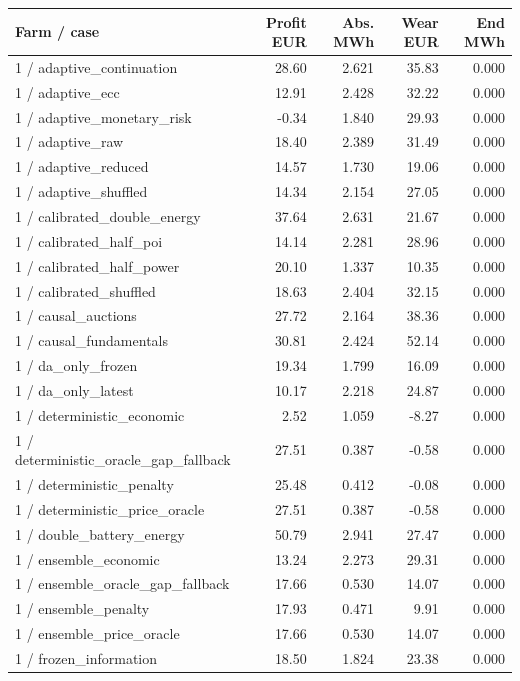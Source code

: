\begingroup\small
\begin{longtable}{lrrrr}
\toprule
Farm / case & Profit EUR & Abs. MWh & Wear EUR & End MWh\\
\midrule\endhead
1 / adaptive\_continuation & 28.60 & 2.621 & 35.83 & 0.000\\
1 / adaptive\_ecc & 12.91 & 2.428 & 32.22 & 0.000\\
1 / adaptive\_monetary\_risk & -0.34 & 1.840 & 29.93 & 0.000\\
1 / adaptive\_raw & 18.40 & 2.389 & 31.49 & 0.000\\
1 / adaptive\_reduced & 14.57 & 1.730 & 19.06 & 0.000\\
1 / adaptive\_shuffled & 14.34 & 2.154 & 27.05 & 0.000\\
1 / calibrated\_double\_energy & 37.64 & 2.631 & 21.67 & 0.000\\
1 / calibrated\_half\_poi & 14.14 & 2.281 & 28.96 & 0.000\\
1 / calibrated\_half\_power & 20.10 & 1.337 & 10.35 & 0.000\\
1 / calibrated\_shuffled & 18.63 & 2.404 & 32.15 & 0.000\\
1 / causal\_auctions & 27.72 & 2.164 & 38.36 & 0.000\\
1 / causal\_fundamentals & 30.81 & 2.424 & 52.14 & 0.000\\
1 / da\_only\_frozen & 19.34 & 1.799 & 16.09 & 0.000\\
1 / da\_only\_latest & 10.17 & 2.218 & 24.87 & 0.000\\
1 / deterministic\_economic & 2.52 & 1.059 & -8.27 & 0.000\\
1 / deterministic\_oracle\_gap\_fallback & 27.51 & 0.387 & -0.58 & 0.000\\
1 / deterministic\_penalty & 25.48 & 0.412 & -0.08 & 0.000\\
1 / deterministic\_price\_oracle & 27.51 & 0.387 & -0.58 & 0.000\\
1 / double\_battery\_energy & 50.79 & 2.941 & 27.47 & 0.000\\
1 / ensemble\_economic & 13.24 & 2.273 & 29.31 & 0.000\\
1 / ensemble\_oracle\_gap\_fallback & 17.66 & 0.530 & 14.07 & 0.000\\
1 / ensemble\_penalty & 17.93 & 0.471 & 9.91 & 0.000\\
1 / ensemble\_price\_oracle & 17.66 & 0.530 & 14.07 & 0.000\\
1 / frozen\_information & 18.50 & 1.824 & 23.38 & 0.000\\

\end{longtable}
